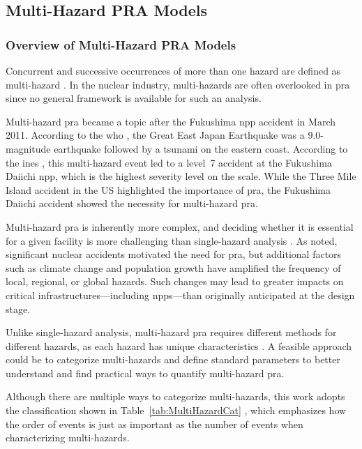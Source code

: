 \subsection{Multi-Hazard PRA Models}
\label{sec:multiHazardPRA}

\subsubsection{Overview of Multi-Hazard PRA Models}
\label{subsec:overviewMultiHazard}

Concurrent and successive occurrences of more than one hazard are defined as multi-hazard \cite{47}. In the nuclear industry, multi-hazards are often overlooked in \acrshort{pra} since no general framework is available for such an analysis.

Multi-hazard \acrshort{pra} became a topic after the Fukushima \acrshort{npp} accident in March 2011. According to the \acrshort{who} \cite{48}, the Great East Japan Earthquake was a 9.0-magnitude earthquake followed by a tsunami on the eastern coast. According to the \acrshort{ines} \cite{49}, this multi-hazard event led to a level~7 accident at the Fukushima Daiichi \acrshort{npp}, which is the highest severity level on the scale. While the Three Mile Island accident in the US highlighted the importance of \acrshort{pra}, the Fukushima Daiichi accident showed the necessity for multi-hazard \acrshort{pra}.

Multi-hazard \acrshort{pra} is inherently more complex, and deciding whether it is essential for a given facility is more challenging than single-hazard analysis \cite{50}. As noted, significant nuclear accidents motivated the need for \acrshort{pra}, but additional factors such as climate change and population growth have amplified the frequency of local, regional, or global hazards. Such changes may lead to greater impacts on critical infrastructures---including \acrshort{npp}s---than originally anticipated at the design stage.

Unlike single-hazard analysis, multi-hazard \acrshort{pra} requires different methods for different hazards, as each hazard has unique characteristics \cite{51}. A feasible approach could be to categorize multi-hazards and define standard parameters to better understand and find practical ways to quantify multi-hazard \acrshort{pra}.

Although there are multiple ways to categorize multi-hazards, this work adopts the classification shown in Table~\ref{tab:MultiHazardCat} \cite{52}, which emphasizes how the order of events is just as important as the number of events when characterizing multi-hazards.

